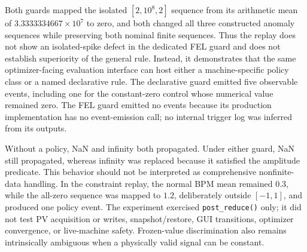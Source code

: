 Both guards mapped the isolated $[2,10^8,2]$ sequence from its arithmetic mean
of $3.3333334667\times10^7$ to zero, and both changed all three constructed
anomaly sequences while preserving both nominal finite sequences.  Thus the
replay does not show an isolated-spike defect in the dedicated FEL guard and
does not establish superiority of the general rule.  Instead, it demonstrates
that the same optimizer-facing evaluation interface can host either a
machine-specific policy class or a named declarative rule.  The declarative
guard emitted five observable events, including one for the constant-zero
control whose numerical value remained zero.  The FEL guard emitted no events
because its production implementation has no event-emission call; no internal
trigger log was inferred from its outputs.

Without a policy, NaN and infinity both propagated.  Under either guard, NaN
still propagated, whereas infinity was replaced because it satisfied the
amplitude predicate.  This behavior should not be interpreted as comprehensive
nonfinite-data handling.  In the constraint replay, the normal BPM mean
remained $0.3$, while the all-zero sequence was mapped to $1.2$, deliberately
outside $[-1,1]$, and produced one policy event.  The experiment exercised
\texttt{post\_reduce()} only; it did not test PV acquisition or writes,
snapshot/restore, GUI transitions, optimizer convergence, or live-machine
safety.  Frozen-value discrimination also remains intrinsically ambiguous
when a physically valid signal can be constant.
